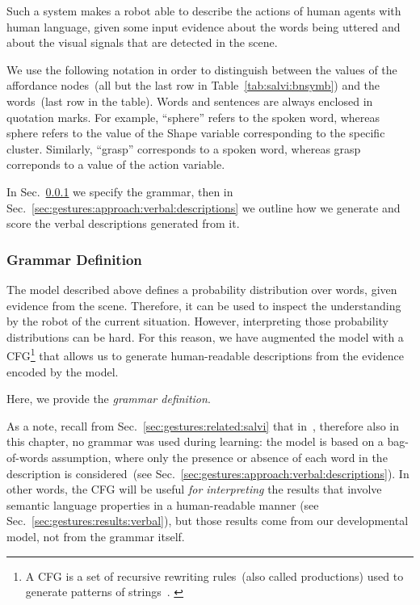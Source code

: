 Such a system makes a robot able to describe the actions of human agents with human language, given some input evidence about the words being uttered and about the visual signals that are detected in the scene.

We use the following notation in order to distinguish between the values of the affordance nodes~(all but the last row in Table~\ref{tab:salvi:bnsymb}) and the words~(last row in the table).
Words and sentences are always enclosed in quotation marks.
For example, ``sphere'' refers to the spoken word, whereas sphere refers to the value of the Shape variable corresponding to the specific cluster.
Similarly, ``grasp'' corresponds to a spoken word, whereas grasp correponds to a value of the action variable.

In Sec.~\ref{sec:gestures:approach:verbal:grammar} we specify the grammar, then in Sec.~\ref{sec:gestures:approach:verbal:descriptions} we outline how we generate and score the verbal descriptions generated from it.

\subsubsection{Grammar Definition}
\label{sec:gestures:approach:verbal:grammar}

The model described above defines a probability distribution over words, given evidence from the scene.
Therefore, it can be used to inspect the understanding by the robot of the current situation.
However, interpreting those probability distributions can be hard.
For this reason, we have augmented the model with a \ac{CFG}\footnote{A \ac{CFG} is a set of recursive rewriting rules~(also called productions) used to generate patterns of strings~\cite{sipser:2012:introtc3}. \label{footnote:cfg}}
that allows us to generate human-readable descriptions from the evidence encoded by the model.

Here, we provide the \emph{grammar definition}.

As a note, recall from Sec.~\ref{sec:gestures:related:salvi} that in~\cite{salvi:2012:smcb}, therefore also in this chapter, no grammar was used during learning:
the model is based on a bag-of-words assumption, where only the presence or absence of each word in the description is considered~(see Sec.~\ref{sec:gestures:approach:verbal:descriptions}).
In other words, the \ac{CFG} will be useful \emph{for interpreting} the results that involve semantic language properties in a human-readable manner (see Sec.~\ref{sec:gestures:results:verbal}), but those results come from our developmental model, not from the grammar itself.

